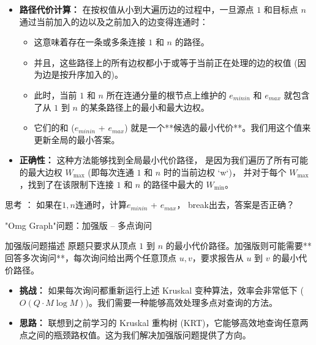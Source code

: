 \documentclass[11pt]{beamer}
\begin{document}
\begin{frame}
    \begin{itemize}
        \item \textbf{路径代价计算：} 在按权值从小到大遍历边的过程中，一旦源点 $1$ 和目标点 $n$ 通过当前加入的边以及之前加入的边变得连通时：
        \begin{itemize}
            \item 这意味着存在一条或多条连接 $1$ 和 $n$ 的路径。
            \item 并且，这些路径上的所有边权都小于或等于当前正在处理的边的权值 (因为边是按升序加入的)。
            \item 此时，当前 $1$ 和 $n$ 所在连通分量的根节点上维护的 $e_{minin}$ 和 $e_{max}$ 就包含了从 $1$ 到 $n$ 的某条路径上的最小和最大边权。
            \item 它们的和 ($e_{minin}$ + $e_{max}$) 就是一个**候选的最小代价**。我们用这个值来更新全局的最小答案。
        \end{itemize}
        \item \textbf{正确性：} 这种方法能够找到全局最小代价路径，
        是因为我们遍历了所有可能的最大边权 $W_{\max}$ (即每次连通 $1$ 和 $n$ 时的当前边权 `w`)，
        并对于每个 $W_{\max}$，找到了在该限制下连接 $1$ 和 $n$ 的路径中最大的 $W_{\min}$。
    \end{itemize}
\end{frame}

\begin{frame}
    思考 ： 如果在$1, n$连通时，计算$e_{minin}$ + $e_{max}$， break出去，答案是否正确？
\end{frame}

\begin{frame}{"Omg Graph"问题：加强版 -- 多点询问}
    \begin{block}{加强版问题描述}
        原题只要求从顶点 $1$ 到 $n$ 的最小代价路径。加强版则可能需要**回答多次询问**，每次询问给出两个任意顶点 $u, v$，要求报告从 $u$ 到 $v$ 的最小代价路径。
    \end{block}
    \begin{itemize}
        \item \textbf{挑战：} 如果每次询问都重新运行上述 Kruskal 变种算法，效率会非常低下 ($O(Q \cdot M \log M)$)。我们需要一种能够高效处理多点对查询的方法。
        \item \textbf{思路：} 联想到之前学习的 Kruskal 重构树 (KRT)，它能够高效地查询任意两点之间的瓶颈路权值。这为我们解决加强版问题提供了方向。
    \end{itemize}
\end{frame}
\end{document}
